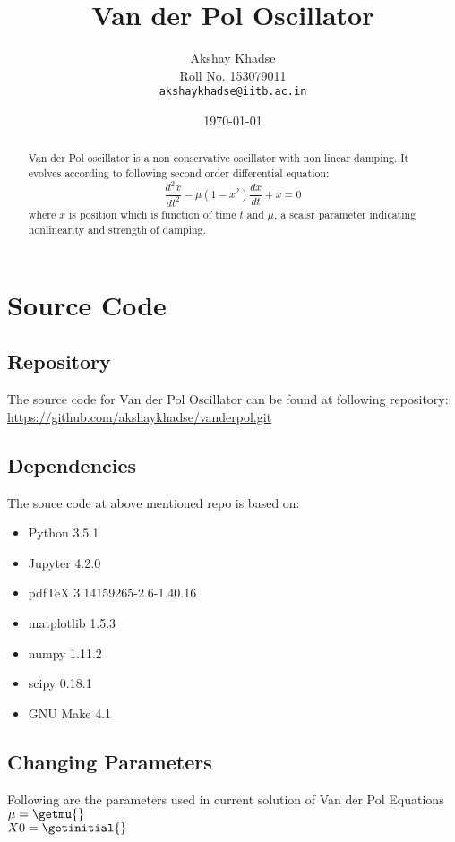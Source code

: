 \documentclass[12pt, a4paper]{article}
\begin{document}
\title{Van der Pol Oscillator}
\author{Akshay Khadse\\
	Roll No. 153079011\\
	\texttt{akshaykhadse@iitb.ac.in}
	}
\date{\today}
\maketitle

\tableofcontents
\listoffigures



\begin{abstract}
Van der Pol oscillator is a non conservative oscillator\cite{wiki} with non linear damping. It evolves according to following second order differential equation:
\begin{equation} \label{sec-ord-eq}
\frac{d^2x}{dt^2}-\mu(1-x^2)\frac{dx}{dt}+x=0
\end{equation}
where $x$ is position which is function of time $t$ and $\mu$, a scalsr parameter indicating nonlinearity and strength of damping.
\end{abstract}

\section{Source Code}
\subsection{Repository}
The source code for Van der Pol Oscillator can be found at following repository:\\
\url{https://github.com/akshaykhadse/vanderpol.git}

\subsection{Dependencies}
The souce code at above mentioned repo is based on:
\begin{itemize}
\item Python 3.5.1
\item Jupyter 4.2.0
\item pdfTeX 3.14159265-2.6-1.40.16
\item matplotlib 1.5.3
\item numpy 1.11.2
\item scipy 0.18.1
\item GNU Make 4.1
\end{itemize}

\subsection{Changing Parameters}
Following are the parameters used in current solution of Van der Pol Equations\\
$\mu = \getmu{}$\\
$X0 = \getinitial{}$
\end{document}
